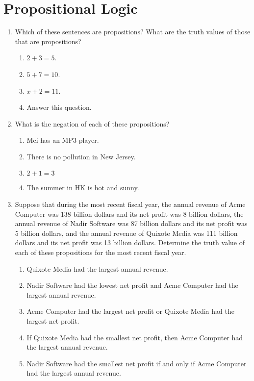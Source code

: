 \documentclass{sig-alternate-05-2015}
\begin{document}
\section{Propositional Logic}
\begin{enumerate}
\item Which of these sentences are propositions? What are the
truth values of those that are propositions?
\begin{enumerate}
	\item $2 + 3 = 5$.
	\item $5 + 7 = 10$.
	\item $x + 2 = 11$.
	\item Answer this question.
\end{enumerate}

\item What is the negation of each of these propositions?
\begin{enumerate}
	\item Mei has an MP3 player.
	\item There is no pollution in New Jersey.
	\item $2 + 1 = 3$
	\item The summer in HK is hot and sunny.
\end{enumerate}

\item Suppose that during the most recent fiscal year, the annual
revenue of Acme Computer was 138 billion dollars
and its net profit was 8 billion dollars, the annual revenue
of Nadir Software was 87 billion dollars and its net profit
was 5 billion dollars, and the annual revenue of Quixote
Media was 111 billion dollars and its net profit was
13 billion dollars. Determine the truth value of each of
these propositions for the most recent fiscal year.
\begin{enumerate}
	\item Quixote Media had the largest annual revenue.
	\item Nadir Software had the lowest net profit and Acme
	Computer had the largest annual revenue.
	\item Acme Computer had the largest net profit or Quixote
	Media had the largest net profit.
	\item If Quixote Media had the smallest net profit, then
	Acme Computer had the largest annual revenue.
	\item Nadir Software had the smallest net profit if and only
	if Acme Computer had the largest annual revenue.
\end{enumerate}


\end{enumerate}
\end{document}

